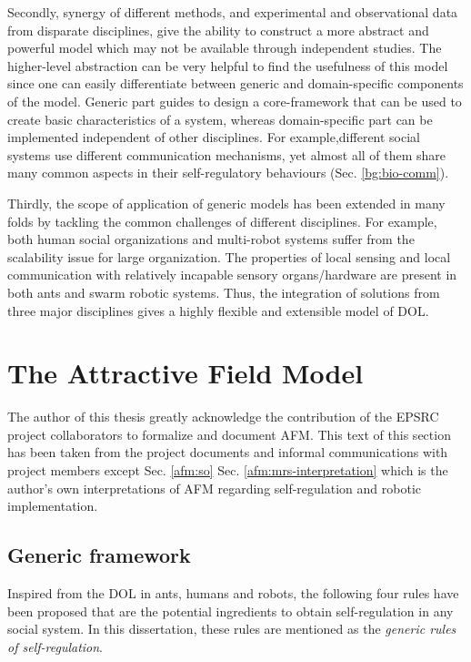 Secondly, synergy of different methods, and experimental and observational data from disparate disciplines, give the ability to construct a more abstract and powerful model which may not be available through independent studies. The higher-level abstraction can be very helpful to find the usefulness of this model since one can easily differentiate between generic and domain-specific components of the model. Generic part guides  to design a core-framework that can be used to create basic characteristics of a system, whereas domain-specific part can be implemented independent of other disciplines. For example,different social systems use different communication mechanisms, yet almost all of them share many common aspects in their self-regulatory behaviours (Sec. \ref{bg:bio-comm}). 

Thirdly,  the scope of application of generic models has been extended in many folds by tackling the common challenges of different disciplines. For example, both human social organizations and multi-robot systems suffer from the scalability issue for large organization. The properties of local sensing and local communication with relatively incapable sensory organs/hardware are present in both ants and swarm robotic systems. Thus, the integration of solutions from three major disciplines gives  a highly flexible and extensible model of DOL.
\section{The Attractive Field Model}
\label{afm:model}
The author of this thesis greatly acknowledge the contribution of the EPSRC project collaborators to formalize and document AFM. This text of this section has been taken from the project documents and informal communications with project members except Sec. \ref{afm:so} Sec. \ref{afm:mrs-interpretation} which is the author's own interpretations of AFM regarding self-regulation and robotic implementation.
\subsection{Generic framework}
\label{afm:framework}
Inspired from the DOL in ants, humans and robots,  the following four rules   have been proposed that are the potential ingredients to obtain self-regulation in any social system. In this dissertation, these rules are mentioned as the {\em generic rules of self-regulation}.

